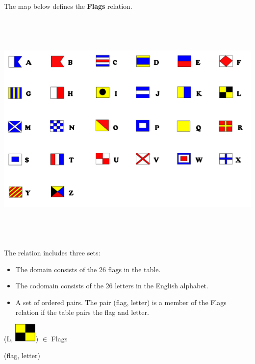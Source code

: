 \documentclass{ximera}
\begin{document}
\begin{definition}
  The map below defines the \textbf{Flags} relation.
  
  

    \includegraphics[width=715px,height=450px]{pics/flags/flag_letter.png}

  
 

  The  relation includes three sets:
    \begin{itemize}
    \item The domain consists of the 26 flags in the table.
    \item The codomain consists of the 26 letters in the English alphabet.
    \item A set of ordered pairs. The pair (flag, letter) is a member of the Flags relation if the table pairs the flag and letter.
    \end{itemize}

  
\end{definition}



\begin{exercise}

 (L, {\includegraphics[width=42px,height=36px]{pics/flags/L.png}}) $\in$ Flags 

  \begin{multipleChoice}
  \end{multipleChoice}
  \begin{feedback}
(flag, letter)
  \end{feedback}
\end{exercise}
\end{document}
